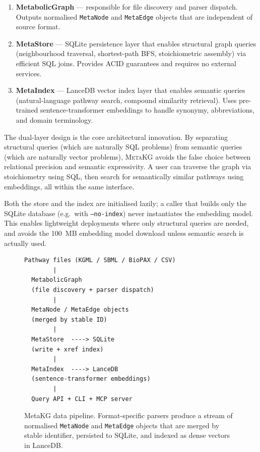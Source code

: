 \documentclass[10pt]{article}
\begin{document}
\begin{enumerate}[leftmargin=*]
  \item \textbf{MetabolicGraph} — responsible for file discovery and parser
    dispatch. Outputs normalised \texttt{MetaNode} and \texttt{MetaEdge}
    objects that are independent of source format.
  \item \textbf{MetaStore} — SQLite persistence layer that enables structural
    graph queries (neighbourhood traversal, shortest-path BFS, stoichiometric
    assembly) via efficient SQL joins. Provides ACID guarantees and requires
    no external services.
  \item \textbf{MetaIndex} — LanceDB vector index layer that enables semantic
    queries (natural-language pathway search, compound similarity retrieval).
    Uses pre-trained sentence-transformer embeddings to handle synonymy,
    abbreviations, and domain terminology.
\end{enumerate}

The dual-layer design is the core architectural innovation. By separating
structural queries (which are naturally SQL problems) from semantic queries
(which are naturally vector problems), \textsc{MetaKG} avoids the false choice
between relational precision and semantic expressivity. A user can traverse the
graph via stoichiometry using SQL, then search for semantically similar
pathways using embeddings, all within the same interface.

Both the store and the index are initialised lazily; a caller that builds
only the SQLite database (e.g.\ with \texttt{--no-index}) never instantiates
the embedding model. This enables lightweight deployments where only structural
queries are needed, and avoids the 100~MB embedding model download unless
semantic search is actually used.

\begin{figure}[H]
  \centering
  \begin{lstlisting}[style=bash, frame=single, caption={High-level data flow.}]
Pathway files (KGML / SBML / BioPAX / CSV)
        |
  MetabolicGraph
  (file discovery + parser dispatch)
        |
  MetaNode / MetaEdge objects
  (merged by stable ID)
        |
  MetaStore  ----> SQLite
  (write + xref index)
        |
  MetaIndex  ----> LanceDB
  (sentence-transformer embeddings)
        |
  Query API + CLI + MCP server
  \end{lstlisting}
  \caption{MetaKG data pipeline. Format-specific parsers produce a stream of
  normalised \texttt{MetaNode} and \texttt{MetaEdge} objects that are merged
  by stable identifier, persisted to SQLite, and indexed as dense vectors in
  LanceDB.}
  \label{fig:arch}
\end{figure}
\end{document}
